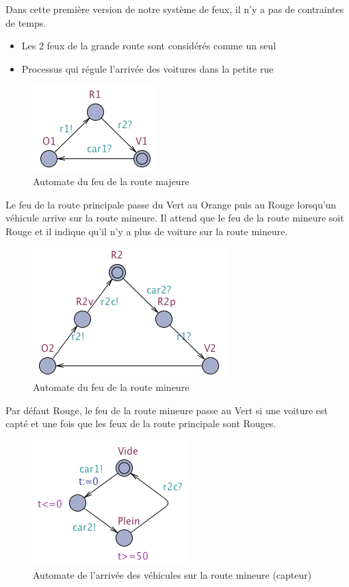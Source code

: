 \documentclass[11pt]{article}
\begin{document}
Dans cette première version de notre système de feux, il n'y a pas de contraintes de temps.

\begin{itemize}
	\item Les 2 feux de la grande route sont considérés comme un seul
	\item Processus qui régule l'arrivée des voitures dans la petite rue
\end{itemize}

\begin{figure}[H]
	\centering
	\includegraphics{ressources/part3/Q9-1.png}
	\caption{Automate du feu de la route majeure}
\end{figure}

Le feu de la route principale passe du Vert au Orange puis au Rouge lorsqu'un véhicule arrive sur la route mineure. Il attend que le feu de la route mineure soit Rouge et il indique qu'il n'y a plus de voiture sur la route mineure.
\begin{figure}[H]
	\centering
	\includegraphics{ressources/part3/Q9-2.png}
	\caption{Automate du feu de la route mineure}
\end{figure}

Par défaut Rouge, le feu de la route mineure passe au Vert si une voiture est capté et une fois que les feux de la route principale sont Rouges.

\begin{figure}[H]
	\centering
	\includegraphics{ressources/part3/Q9-3.png}
	\caption{Automate de l'arrivée des véhicules sur la route mineure (capteur)}
\end{figure}
\end{document}
